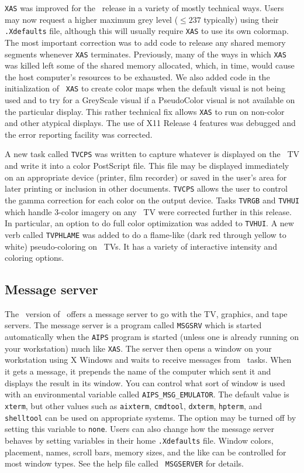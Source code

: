 {\tt XAS} was improved for the \RELEASENAME\ release in a variety of
mostly technical ways.  Users may now request a higher maximum grey
level ($ \leq 237$ typically) using their {\tt .Xdefaults} file,
although this will usually require {\tt XAS} to use its own colormap.
The most important correction was to add code to release any shared
memory segments whenever {\tt XAS} terminates.  Previously, many of
the ways in which {\tt XAS} was killed left some of the shared memory
allocated, which, in time, would cause the host computer's resources
to be exhausted.  We also added code in the initialization of {\tt
XAS} to create color maps when the default visual is not being used
and to try for a GreyScale visual if a PseudoColor visual is not
available on the particular display.  This rather technical fix allows
{\tt XAS} to run on non-color and other atypical displays.  The use of
X11 Release 4 features was debugged and the error reporting facility
was corrected.

A new task called {\tt TVCPS} was written to capture whatever is
displayed on the \AIPS\ TV and write it into a color PostScript file.
This file may be displayed immediately on an appropriate device
(printer, film recorder) or saved in the user's area for later
printing or inclusion in other documents.  {\tt TVCPS} allows the
user to control the gamma correction for each color on the output
device.  Tasks {\tt TVRGB} and {\tt TVHUI} which handle 3-color
imagery on any \AIPS\ TV were corrected further in this release.  In
particular, an option to do full color optimization was added to
\hbox{{\tt TVHUI}}.  A new verb called {\tt TVPHLAME} was added to do
a flame-like (dark red through yellow to white) pseudo-coloring on
\AIPS\ TVs.  It has a variety of interactive intensity and coloring
options.

\subsection{Message server}

The \RELEASENAME\ version of \AIPS\ offers a message server to go with
the TV, graphics, and tape servers.  The message server is a program
called {\tt MSGSRV} which is started automatically when the {\tt AIPS}
program is started (unless one is already running on your workstation)
much like \hbox{{\tt XAS}}.  The server then opens a window on your
workstation using X Windows and waits to receive messages from \AIPS\
tasks.  When it gets a message, it prepends the name of the computer
which sent it and displays the result in its window.  You can control
what sort of window is used with an environmental variable called
\hbox{{\tt AIPS\_MSG\_EMULATOR}}.  The default value is {\tt xterm},
but other values such as {\tt aixterm}, {\tt cmdtool}, {\tt dxterm},
{\tt hpterm}, and {\tt shelltool} can be used on appropriate systems.
The option may be turned off by setting this variable to {\tt none}.
Users can also change how the message server behaves by setting
variables in their home {\tt .Xdefaults} file.  Window colors,
placement, names, scroll bars, memory sizes, and the like can be
controlled for most window types. See the help file called {\tt
MSGSERVER} for details.

